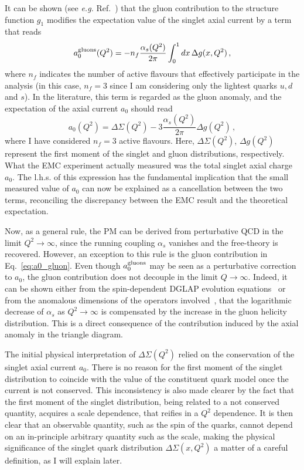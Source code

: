 It can be shown (see \textit{e.g.} Ref.~\cite{Anselmino:1993tc}) that the gluon contribution to the structure function $g_1$ modifies the expectation value of the singlet axial current by a term that reads
\begin{equation}
  a_{0}^{\textrm{gluons}}(Q^2) = - n_{f} \frac{\alpha_s(Q^2)}{2\pi} \int_{0}^{1} dx \, \Delta g (x, Q^2) \,,
\end{equation}
where $n_{f}$ indicates the number of active flavours that effectively participate in the analysis (in this case, $n_f = 3$ since I am considering only the lightest quarks $u,d$ and $s$). In the literature, this term is regarded as the gluon anomaly, and the expectation of the axial current $a_0$ should read
\begin{equation}
  a_{0} (Q^2) = \Delta \Sigma (Q^2) - 3 \frac{\alpha_{s}(Q^2)}{2\pi} \Delta g (Q^2) \,,
  \label{eq:a0_gluon}
\end{equation}
where I have considered $n_f = 3$ active flavours. Here, $\Delta \Sigma(Q^2)$, $\Delta g(Q^2)$ represent the first moment of the singlet and gluon distributions, respectively. What the EMC experiment actually measured was the total singlet axial charge $a_0$. The l.h.s. of this expression has the fundamental implication that the small measured value of $a_0$ can now be explained as a cancellation between the two terms, reconciling the discrepancy between the EMC result and the theoretical expectation.\par Now, as a general rule, the PM can be derived from perturbative QCD in the limit $Q^2 \rightarrow \infty$, since the running coupling $\alpha_s$ vanishes and the free-theory is recovered. However, an exception to this rule is the gluon contribution in Eq.~\eqref{eq:a0_gluon}. Even though $a_{0}^{\textrm{gluons}}$ may be seen as a perturbative correction to $a_0$, the gluon contribution does not decouple in the limit $Q \rightarrow \infty$. Indeed, it can be shown either from the spin-dependent DGLAP evolution equations~\cite{Borah:2012ey} or from the anomalous dimensions of the operators involved~\cite{Anselmino:1994gn}, that the logarithmic decrease of $\alpha_s$ as $Q^2 \rightarrow \infty$ is compensated by the increase in the gluon helicity distribution. This is a direct consequence of the contribution induced by the axial anomaly in the triangle diagram.%

The initial physical interpretation of $\Delta \Sigma (Q^2)$ relied on the conservation of the singlet axial current $a_0$. There is no reason for the first moment of the singlet distribution to coincide with the value of the constituent quark model once the current is not conserved. This inconsistency is also made clearer by the fact that the first moment of the singlet distribution, being related to a not conserved quantity, acquires a scale dependence, that reifies in a $Q^2$ dependence. It is then clear that an observable quantity, such as the spin of the quarks, cannot depend on an in-principle arbitrary quantity such as the scale, making the physical significance of the singlet quark distribution $\Delta \Sigma(x,Q^2)$ a matter of a careful definition, as I will explain later.%

